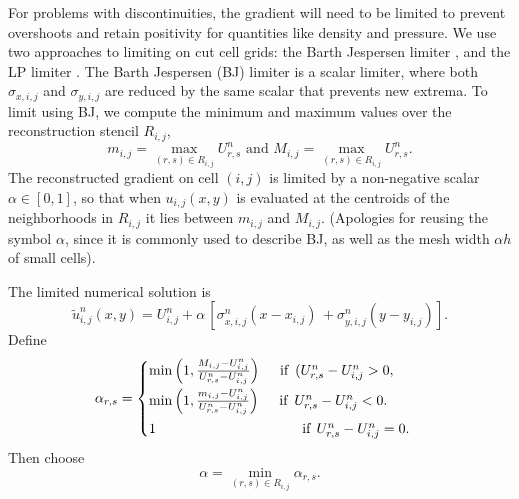 For problems with discontinuities, the gradient will need to be limited
to prevent overshoots and retain positivity for quantities like density and
pressure.
We use two approaches to limiting on cut cell grids: the Barth Jespersen limiter \cite{barth-jespersen}, and the LP limiter \cite{May_Berger_LP}.
The Barth Jespersen (BJ) limiter is a scalar limiter, where both $\sigma_{x,i,j}$ and $\sigma_{y,i,j}$ are reduced by the same scalar that prevents new extrema.  
To limit using BJ, we compute the minimum and maximum values over the reconstruction stencil $R_{i,j}$, 
\begin{equation} 
m_{i,j} = \max_{(r,s) \in R_{i,j}} U^n_{r,s} \text{ and } 
M_{i,j} = \max_{(r,s) \in R_{i,j}} U^n_{r,s}.
\label{eqn:bj1}
\end{equation}
The reconstructed gradient on cell $(i,j)$ is limited by a non-negative 
scalar $\alpha \in [0,1]$, so that when ${u}_{i,j}(x,y)$ 
is evaluated at the centroids of the neighborhoods in $R_{i,j}$ it
lies between $m_{i,j}$ and $M_{i,j}$.
(Apologies for reusing the symbol $\alpha$, since it is commonly used to 
describe BJ, as well as the mesh width $\alpha h$  of small cells).

The limited numerical solution is
\begin{equation}
     \tilde{u}^n_{i,j}(x,y) = U_{i,j}^n + \alpha \, [{\sigma}^n_{x,i,j} ( x -  x_{i,j}) \, 
   + {\sigma}^n_{y,i,j}( y -  y_{i,j})].
\end{equation}
Define
\begin{equation}\label{eq:bj_alpha}
    \alpha_{r,s} = \begin{cases}
           \min \left(1,\frac{M_{i,j}-U_{i,j}^n}{U^n_{r,s} - U_{i,j}^n} \right)
    \quad  \text{ if } \,  ( U_{r,s}^n - U_{i,j}^n >  0,\\[.08in]
            \min \left(1, \frac{m_{i,j}-U_{i,j}^n}{U^n_{r,s} - U_{i,j}^n} \right)  
    \quad  \text{ if }  \, U^n_{r,s} - U_{i,j}^n < 0.\\[.08in]
             1    \hspace*{1.45in}  \text{if} \; \, U^n_{r,s} - U_{i,j}^n = 0.
    \end{cases}
\end{equation}
Then choose
\begin{equation}\label{eqn:alpha}
\alpha = \min_{(r,s) \in R_{i,j}} \alpha_{r,s} .
\end{equation}

